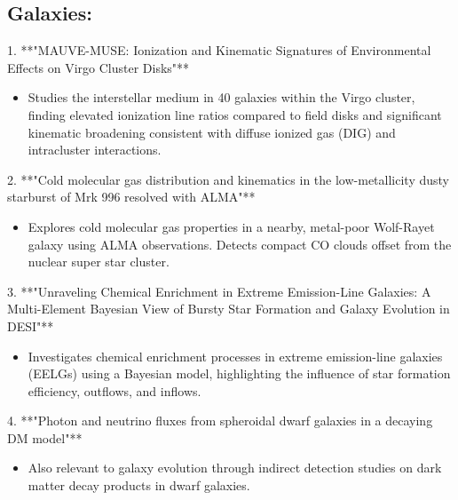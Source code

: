 \documentclass[11pt]{article}
\begin{document}
\subsection*{Galaxies:}
1. **"MAUVE-MUSE: Ionization and Kinematic Signatures of Environmental Effects on Virgo Cluster Disks"**
\begin{itemize}
\item Studies the interstellar medium in 40 galaxies within the Virgo cluster, finding elevated ionization line ratios compared to field disks and significant kinematic broadening consistent with diffuse ionized gas (DIG) and intracluster interactions.
\end{itemize}
2. **"Cold molecular gas distribution and kinematics in the low-metallicity dusty starburst of Mrk 996 resolved with ALMA"**
\begin{itemize}
\item Explores cold molecular gas properties in a nearby, metal-poor Wolf-Rayet galaxy using ALMA observations. Detects compact CO clouds offset from the nuclear super star cluster.
\end{itemize}
3. **"Unraveling Chemical Enrichment in Extreme Emission-Line Galaxies: A Multi-Element Bayesian View of Bursty Star Formation and Galaxy Evolution in DESI"**
\begin{itemize}
\item Investigates chemical enrichment processes in extreme emission-line galaxies (EELGs) using a Bayesian model, highlighting the influence of star formation efficiency, outflows, and inflows.
\end{itemize}
4. **"Photon and neutrino fluxes from spheroidal dwarf galaxies in a decaying DM model"**
\begin{itemize}
\item Also relevant to galaxy evolution through indirect detection studies on dark matter decay products in dwarf galaxies.
\end{itemize}
\end{document}
